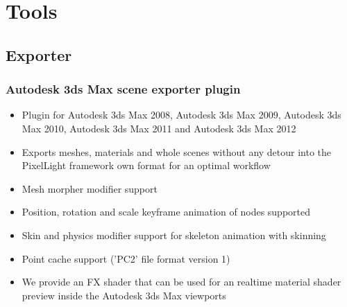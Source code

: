 \chapter{Tools}




\section{Exporter}


\subsection{Autodesk 3ds Max scene exporter plugin}
\begin{itemize}
\item{Plugin for Autodesk 3ds Max 2008, Autodesk 3ds Max 2009, Autodesk 3ds Max 2010, Autodesk 3ds Max 2011 and Autodesk 3ds Max 2012}
\item{Exports meshes, materials and whole scenes without any detour into the PixelLight framework own format for an optimal workflow}
\item{Mesh morpher modifier support}
\item{Position, rotation and scale keyframe animation of nodes supported}
\item{Skin and physics modifier support for skeleton animation with skinning}
\item{Point cache support ('PC2' file format version 1)}
\item{We provide an FX shader that can be used for an realtime material shader preview inside the Autodesk 3ds Max viewports}
\end{itemize}
